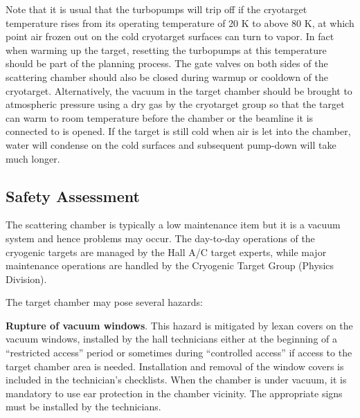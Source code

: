 {%

Note that it is usual that the turbopumps will trip off if the cryotarget temperature rises from its operating temperature of 20 K to above 80 K, at which point air frozen out on the cold cryotarget surfaces can turn to vapor. In fact when warming up the target, resetting the turbopumps at this temperature should be part of the planning process. The gate valves on both sides of the scattering chamber should also be closed during warmup or cooldown of the cryotarget. Alternatively, the vacuum in the target chamber should be brought to atmospheric pressure using a dry gas by the cryotarget group so that the target can warm to room temperature before the chamber or the beamline it is connected to is opened. If the target is still cold when air is let into the chamber, water will condense on the cold surfaces and subsequent pump-down will take much longer.

\begin{safetyen}{0}{0}
\subsection{Safety Assessment}


The scattering chamber is typically a low maintenance item but it is a vacuum system and hence problems may occur. The day-to-day operations of the cryogenic targets are managed by the Hall A/C target experts, while major maintenance operations are handled by the Cryogenic Target Group (Physics Division). 

The target chamber may pose several hazards:

\begin{list}{.~}{\setlength{\itemsep}{-0.15cm}}
  \item {\bf Rupture of vacuum windows}. This hazard is mitigated by
        lexan covers on the vacuum windows, installed by the hall technicians
        either at the beginning of a ``restricted access'' period 
        or sometimes during ``controlled access'' if access to the target chamber area is needed.
        Installation and removal of the window covers is included in the technician's checklists.
        When the chamber is under vacuum, it is mandatory to use ear protection in the chamber
        vicinity. The appropriate signs must be installed by the technicians. 


\end{list}
\end{safetyen}}
